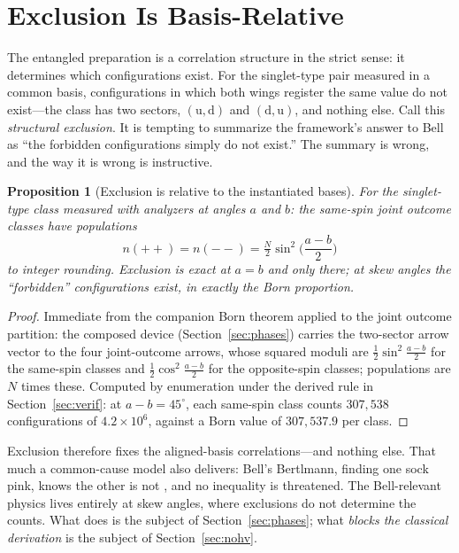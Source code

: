 \documentclass[11pt]{article}
\newtheorem{proposition}{Proposition}
\theoremstyle{definition}
\theoremstyle{remark}
\begin{document}
\section{Exclusion Is Basis-Relative}\label{sec:excl}
The entangled preparation is a correlation structure in the strict sense: it determines which configurations exist. For the singlet-type pair measured in a common basis, configurations in which both wings register the same value do not exist---the class has two sectors, $(\mathrm{u},\mathrm{d})$ and $(\mathrm{d},\mathrm{u})$, and nothing else. Call this \emph{structural exclusion}. It is tempting to summarize the framework's answer to Bell as ``the forbidden configurations simply do not exist.'' The summary is wrong, and the way it is wrong is instructive.

\begin{proposition}[Exclusion is relative to the instantiated bases]\label{prop:excl}
For the singlet-type class measured with analyzers at angles $a$ and $b$: the same-spin joint outcome classes have populations
\[ n({+}{+}) = n({-}{-}) = \tfrac{N}{2}\sin^2\!\Big(\frac{a-b}{2}\Big) \]
to integer rounding. Exclusion is exact at $a = b$ and only there; at skew angles the ``forbidden'' configurations exist, in exactly the Born proportion.
\end{proposition}
\begin{proof}
Immediate from the companion Born theorem applied to the joint outcome partition: the composed device (Section~\ref{sec:phases}) carries the two-sector arrow vector to the four joint-outcome arrows, whose squared moduli are $\frac{1}{2}\sin^2\frac{a-b}{2}$ for the same-spin classes and $\frac{1}{2}\cos^2\frac{a-b}{2}$ for the opposite-spin classes; populations are $N$ times these. Computed by enumeration under the derived rule in Section~\ref{sec:verif}: at $a - b = 45^\circ$, each same-spin class counts $307{,}538$ configurations of $4.2 \times 10^6$, against a Born value of $307{,}537.9$ per class.
\end{proof}

Exclusion therefore fixes the aligned-basis correlations---and nothing else. That much a common-cause model also delivers: Bell's Bertlmann, finding one sock pink, knows the other is not \cite{Bell1981}, and no inequality is threatened. The Bell-relevant physics lives entirely at skew angles, where exclusions do not determine the counts. What does is the subject of Section~\ref{sec:phases}; what \emph{blocks the classical derivation} is the subject of Section~\ref{sec:nohv}.
\end{document}
